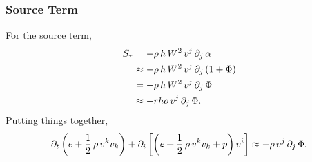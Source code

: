 \subsubsection{Source Term}

For the source term,
\begin{align}
  S_{\tau}&=-\rho\,h\,W^{2}\,v^{j}\,\partial_{j}\,\alpha \\
  &\approx-\rho\,h\,W^{2}\,v^{j}\,\partial_{j}\left(1+\Phi\right) \\
  &=-\rho\,h\,W^{2}\,v^{j}\,\partial_{j}\,\Phi \\
  &\approx-rho\,v^{j}\,\partial_{j}\,\Phi.
\end{align}
Putting things together,
\begin{equation}
  \partial_{t}\left(e+\frac{1}{2}\,\rho\,v^{k}v_{k}\right)
  +\partial_{i}\left[\left(e+\frac{1}{2}\,\rho\,v^{k}v_{k}+p\right)v^{i}\right]
  \approx-\rho\,v^{j}\,\partial_{j}\,\Phi.
\end{equation}

\let\normv\undefined
\let\TF\undefined
\let\LF\undefined
\let\LG\undefined
\let\hNR\undefined
